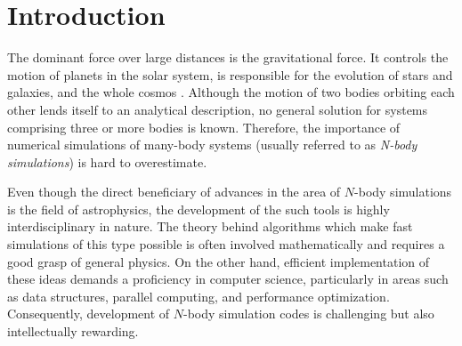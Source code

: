 \chapter{Introduction}
The dominant force over large distances is the gravitational force.
It controls the motion of planets in the solar system, is responsible for the evolution of stars and galaxies, and the whole cosmos \cite{nordtvedt2025gravity}.
Although the motion of two bodies orbiting each other lends itself to an analytical description, no general solution for systems comprising three or more bodies is known.
Therefore, the importance of numerical simulations of many-body systems (usually referred to as \textit{N-body simulations}) is hard to overestimate.

Even though the direct beneficiary of advances in the area of $N$-body simulations is the field of astrophysics, the development of the such tools is highly interdisciplinary in nature.
The theory behind algorithms which make fast simulations of this type possible is often involved mathematically and requires a good grasp of general physics.
On the other hand, efficient implementation of these ideas demands a proficiency in computer science, particularly in areas such as data structures, parallel computing, and performance optimization.
Consequently, development of $N$-body simulation codes is challenging but also intellectually rewarding.




